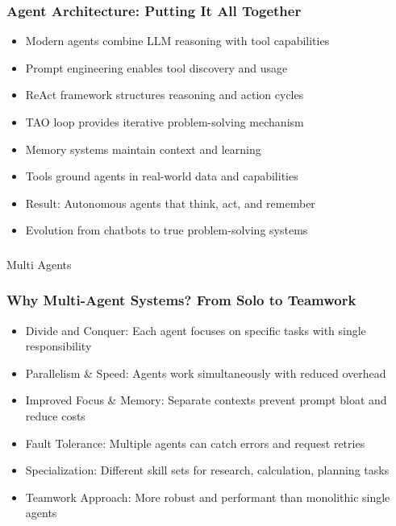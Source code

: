 \begin{frame}[fragile]\frametitle{Agent Architecture: Putting It All Together}
      \begin{itemize}
	  \item Modern agents combine LLM reasoning with tool capabilities
	  \item Prompt engineering enables tool discovery and usage
	  \item ReAct framework structures reasoning and action cycles
	  \item TAO loop provides iterative problem-solving mechanism
	  \item Memory systems maintain context and learning
	  \item Tools ground agents in real-world data and capabilities
	  \item Result: Autonomous agents that think, act, and remember
	  \item Evolution from chatbots to true problem-solving systems
	  \end{itemize}
\end{frame}

\begin{frame}[fragile]\frametitle{}
\begin{center}
{\Large Multi Agents}
\end{center}
\end{frame}

\begin{frame}[fragile]\frametitle{Why Multi-Agent Systems? From Solo to Teamwork}
      \begin{itemize}
		\item Divide and Conquer: Each agent focuses on specific tasks with single responsibility
		\item Parallelism \& Speed: Agents work simultaneously with reduced overhead
		\item Improved Focus \& Memory: Separate contexts prevent prompt bloat and reduce costs
		\item Fault Tolerance: Multiple agents can catch errors and request retries
		\item Specialization: Different skill sets for research, calculation, planning tasks
		\item Teamwork Approach: More robust and performant than monolithic single agents
	  \end{itemize}
\end{frame}

